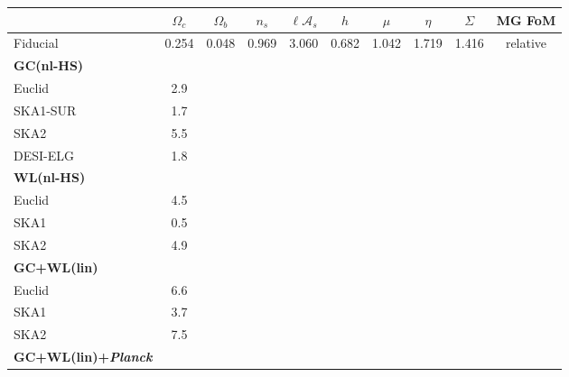 \begin{table}[htbp]
\centering{}%
\footnotesize
\begin{tabular}{|l|c|c|c|c|c||c|c|c|c|}
	\hline
	 & $\Omega_{c}$ & $\Omega_{b}$ & $n_{s}$ & $\ell\mathcal{A}_{s}$ & $h$ & $\mu$ & $\eta$ & $\Sigma$ & MG FoM \TBstrut\tabularnewline
\hline 
Fiducial & {0.254 } & {0.048 } & {0.969 } & {3.060 } & {0.682 } & {1.042 } & {1.719 } & {1.416 } & relative\TBstrut\tabularnewline
\hline 
\hline 
\textbf{GC(nl-HS)} &  &  &  &  &  &  &  & & \TBstrut\tabularnewline
Euclid   

& 2.9
\tabularnewline
SKA1-SUR  

& 1.7
\tabularnewline
SKA2  

& 5.5
\tabularnewline
DESI-ELG   

& 1.8
\tabularnewline
\hline 
\hline 
\textbf{WL(nl-HS)} &  &  &  &  &  &  &  &  & \TBstrut\tabularnewline
Euclid   

& 4.5
\tabularnewline
SKA1  

& 0.5
\tabularnewline
SKA2  

& 4.9
\tabularnewline
\hline 
\hline 
\textbf{GC+WL(lin)} &  &  &  &  &  &  &  & & \Tstrut\tabularnewline
Euclid  

& 6.6
\tabularnewline
SKA1  

& 3.7
\tabularnewline
SKA2 

& 7.5
\tabularnewline
\hline 
\hline 
\textbf{GC+WL(lin)+{\it Planck}} &  &  &  &  &  &  &  & & \Tstrut\tabularnewline

\end{tabular}
\end{table}
